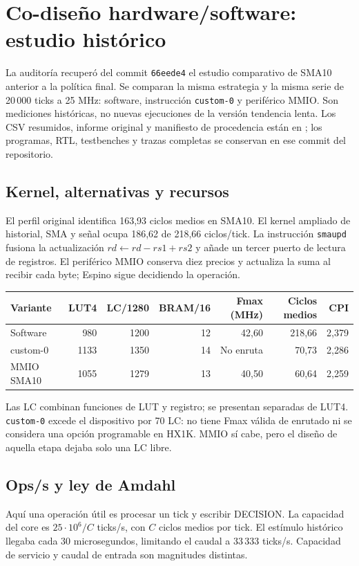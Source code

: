 \section{Co-diseño hardware/software: estudio histórico}
\label{sec:codisenio}
La auditoría recuperó del commit \texttt{66eede4} el estudio comparativo de
SMA10 anterior a la política final. Se comparan la misma estrategia y la misma
serie de 20\,000 ticks a 25 MHz: software, instrucción \texttt{custom-0} y
periférico MMIO. Son mediciones históricas, no nuevas ejecuciones de la versión
tendencia lenta. Los CSV resumidos, informe original y manifiesto de procedencia
están en ; los programas, RTL, testbenches y
trazas completas se conservan en ese commit del repositorio.

\subsection{Kernel, alternativas y recursos}
El perfil original identifica 163,93 ciclos medios en SMA10. El kernel ampliado
de historial, SMA y señal ocupa 186,62 de 218,66 ciclos/tick. La instrucción
\texttt{smaupd} fusiona la actualización $rd\leftarrow rd-rs1+rs2$ y añade un
tercer puerto de lectura de registros. El periférico MMIO conserva diez precios
y actualiza la suma al recibir cada byte; Espino sigue decidiendo la operación.

\begin{center}\small\begin{tabular}{lrrrrrr}\toprule
Variante & LUT4 & LC/1280 & BRAM/16 & Fmax (MHz) & Ciclos medios & CPI \\\midrule
Software & 980 & 1200 & 12 & 42,60 & 218,66 & 2,379 \\
custom-0 & 1133 & 1350 & 14 & No enruta & 70,73 & 2,286 \\
MMIO SMA10 & 1055 & 1279 & 13 & 40,50 & 60,64 & 2,259 \\\bottomrule
\end{tabular}\end{center}
Las LC combinan funciones de LUT y registro; se presentan separadas de LUT4.
\texttt{custom-0} excede el dispositivo por 70 LC: no tiene Fmax válida de
enrutado ni se considera una opción programable en HX1K. MMIO sí cabe, pero
el diseño de aquella etapa dejaba solo una LC libre.

\subsection{Ops/s y ley de Amdahl}
Aquí una operación útil es procesar un tick y escribir DECISION. La capacidad
del core es $25\cdot10^6/C$ ticks/s, con $C$ ciclos medios por tick. El estímulo
histórico llegaba cada 30 microsegundos, limitando el caudal a 33\,333 ticks/s.
Capacidad de servicio y caudal de entrada son magnitudes distintas.

